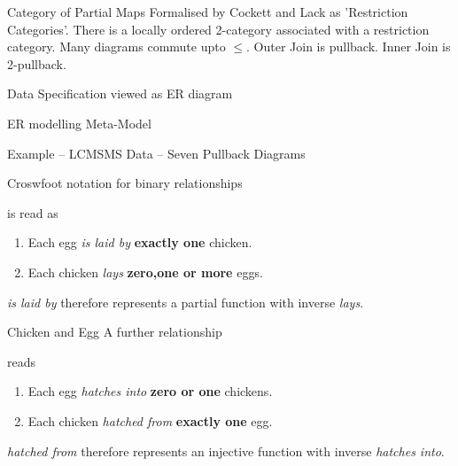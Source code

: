 \documentclass[xcolor=pst,dvips]{beamer}   %
\renewcommand{\erpictureFolder}[0]{../SharedPictures}
\begin{document}
\begin{frame}{Category of Partial Maps}
Formalised by Cockett and Lack as 'Restriction Categories'.
There is a locally ordered 2-category associated with a restriction category.
Many diagrams commute upto $\leq$.
Outer Join is pullback.
Inner Join is 2-pullback.

\end{frame}


\begin{frame}{Data Specification viewed as ER diagram}
\begin{center}
\scalebox{0.5}{

}
\end{center}
\end{frame}
\begin{frame}{ER modelling Meta-Model}
\scalebox{0.23}{

}
\end{frame}
\begin{frame}{Example -- LCMSMS Data -- Seven Pullback Diagrams}
\scalebox{0.2}{

}
\end{frame}

\begin{frame}{Croswfoot notation for binary relationships}
\begin{center}
\scalebox{0.9}{

}
\end{center}
is read as
\begin{center}
\begin{enumerate}
\item Each egg \textit{is laid by} \textbf{exactly one} chicken.
\item Each chicken \textit{lays} \textbf{zero,one or more} eggs.
\end{enumerate}
\end{center}
 \textit{is laid by} therefore represents a partial function with inverse \textit{lays}.
\end{frame}

\begin{frame}{Chicken and Egg}
A further relationship 
\begin{center}
\scalebox{0.9}{

}
\end{center}
reads
\begin{center}
\begin{enumerate}
\item Each egg \textit{hatches into} \textbf{zero or one} chickens.
\item Each chicken \textit{hatched from} \textbf{exactly one} egg.
\end{enumerate}
\end{center}
 \textit{hatched from} therefore represents an injective function with inverse \textit{hatches into}.
\end{frame}
\end{document}
